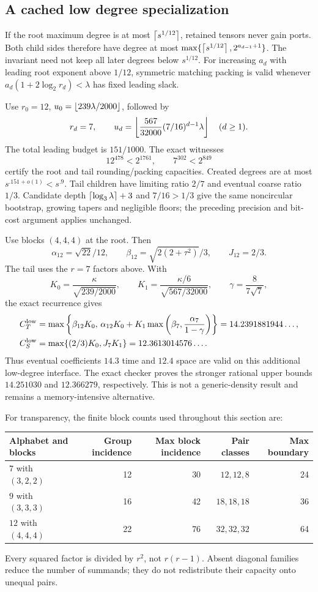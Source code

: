 \subsection{A cached low degree specialization}
If the root maximum degree is at most $\left\lceil s^{1/12}\right\rceil$, retained tensors never gain ports. Both child sides therefore have degree at most
$\max\{\left\lceil s^{1/12}\right\rceil,2^{a_{d-1}+1}\}$. The invariant need not keep all later degrees below $s^{1/12}$. For increasing $a_d$ with leading root exponent above $1/12$, symmetric matching packing is valid whenever $a_d(1+2\log_2r_d)<\lambda$ has fixed leading slack.

Use $r_0=12$, $u_0=\left\lfloor239\lambda/2000\right\rfloor$, followed by
\[
 r_d=7,\qquad
 u_d=\left\lfloor\frac{567}{32000}(7/16)^{d-1}\lambda\right\rfloor\quad(d\ge1).
\]
The total leading budget is $151/1000$. The exact witnesses
\[
 12^{478}<2^{1761},\qquad 7^{302}<2^{849}
\]
certify the root and tail rounding/packing capacities. Created degrees are at most $s^{.151+o(1)}<s^{.9}$. Tail children have limiting ratio $2/7$ and eventual coarse ratio $1/3$. Candidate depth $\left\lceil\log_3\lambda\right\rceil+3$ and $7/16>1/3$ give the same noncircular bootstrap, growing tapers and negligible floors; the preceding precision and bit-cost argument applies unchanged.

Use blocks $(4,4,4)$ at the root. Then
\[
 \alpha_{12}=\sqrt{22}/12,\qquad
 \beta_{12}=\sqrt{2(2+\tau^2)}/3,\qquad J_{12}=2/3.
\]
The tail uses the $r=7$ factors above. With
\[
 K_0=\frac\kappa{\sqrt{239/2000}},\qquad
 K_1=\frac{\kappa/6}{\sqrt{567/32000}},\qquad
 \gamma=\frac8{7\sqrt7},
\]
the exact recurrence gives
\begin{align*}
 C_T^{\rm low}
 &=\max\left\{\beta_{12}K_0,\,
 \alpha_{12}K_0+K_1\max\left(\beta_7,\frac{\alpha_7}{1-\gamma}\right)\right\}
 =14.2391881944\ldots,\\
 C_S^{\rm low}&=\max\{(2/3)K_0,J_7K_1\}=12.3613014576\ldots.
\end{align*}
Thus eventual coefficients $14.3$ time and $12.4$ space are valid on this additional low-degree interface. The exact checker proves the stronger rational upper bounds $14.251030$ and $12.366279$, respectively. This is not a generic-density result and remains a memory-intensive alternative.

For transparency, the finite block counts used throughout this section are:
\begin{center}\small
\begin{tabular}{lrrrr}\toprule
Alphabet and blocks & Group incidence & Max block incidence & Pair classes & Max boundary\\\midrule
$7$ with $(3,2,2)$&12&30&$12,12,8$&24\\
$9$ with $(3,3,3)$&16&42&$18,18,18$&36\\
$12$ with $(4,4,4)$&22&76&$32,32,32$&64\\\bottomrule
\end{tabular}
\end{center}
Every squared factor is divided by $r^2$, not $r(r-1)$. Absent diagonal families reduce the number of summands; they do not redistribute their capacity onto unequal pairs.
